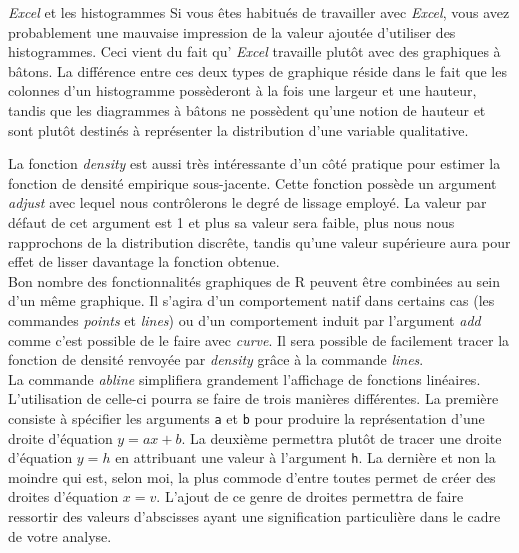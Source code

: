 \begin{moreInfo}{\emph{Excel} et les histogrammes}
	Si vous êtes habitués de travailler avec \emph{Excel}, vous avez probablement une mauvaise impression de la valeur ajoutée d'utiliser des histogrammes. Ceci vient du fait qu’ \emph{Excel} travaille plutôt avec des graphiques à bâtons. La différence entre ces deux types de graphique réside dans le fait que les colonnes d'un histogramme possèderont à la fois une largeur et une hauteur, tandis que les diagrammes à bâtons ne possèdent qu'une notion de hauteur et sont plutôt destinés à représenter la distribution d'une variable qualitative. 
\end{moreInfo}

\noindent
La fonction \emph{density} \cite{Rfunction:density} est aussi très intéressante d'un côté pratique pour estimer la fonction de densité empirique sous-jacente. Cette fonction possède un argument \emph{adjust} avec lequel nous contrôlerons le degré de lissage employé. La valeur par défaut de cet argument est 1 et plus sa valeur sera faible, plus nous nous rapprochons de la distribution discrête, tandis qu'une valeur supérieure aura pour effet de lisser davantage la fonction obtenue. \\

\noindent
Bon nombre des fonctionnalités graphiques de R peuvent être combinées au sein d'un même graphique. Il s'agira d'un comportement natif dans certains cas (les commandes \emph{points} et \emph{lines}) ou d'un comportement induit par l'argument \emph{add} comme c'est possible de le faire avec \emph{curve}. Il sera possible de facilement tracer la fonction de densité renvoyée par \emph{density} grâce à la commande \emph{lines}. \\

\noindent
La commande \emph{abline} \cite{Rfunction:abline} simplifiera grandement l'affichage de fonctions linéaires. L'utilisation de celle-ci pourra se faire de trois manières différentes. La première consiste à spécifier les arguments \texttt{a} et \texttt{b} pour produire la représentation d'une droite d'équation $y = ax + b$. La deuxième permettra plutôt de tracer une droite d'équation $y = h$ en attribuant une valeur à l'argument \texttt{h}. La dernière et non la moindre qui est, selon moi, la plus commode d'entre toutes permet de créer des droites d'équation $x = v$. L'ajout de ce genre de droites permettra de faire ressortir des valeurs d'abscisses ayant une signification particulière dans le cadre de votre analyse. \\


